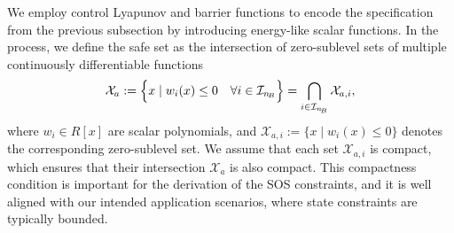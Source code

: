 \documentclass[lettersize,journal]{IEEEtran}
\begin{document}
We employ control Lyapunov and barrier functions to encode the specification from the previous subsection by introducing energy-like scalar functions.
In the process, we define the safe set as the intersection of zero-sublevel sets of multiple continuously differentiable functions
\begin{align} \label{eq:allowable_set}
   \mathcal X_a := \Bigl\{ x \mid w_i(x) \leq 0 \quad \forall i \in \mathcal I_{n_{\!B}} \Bigr\} = \bigcap_{i \in \mathcal I_{n_{\!B}}} \mathcal X_{a,i},
\end{align}
where $w_i \in R[x]$ are scalar polynomials, and $\mathcal X_{a,i} := \{ x \mid w_i(x) \leq 0 \}$ denotes the corresponding zero-sublevel set.
We assume that each set $\mathcal{X}_{a,i}$ is compact, which ensures that their intersection $\mathcal{X}_a$ is also compact.
This compactness condition is important for the derivation of the SOS constraints, and it is well aligned with our intended application scenarios, where state constraints are typically bounded.
\end{document}
